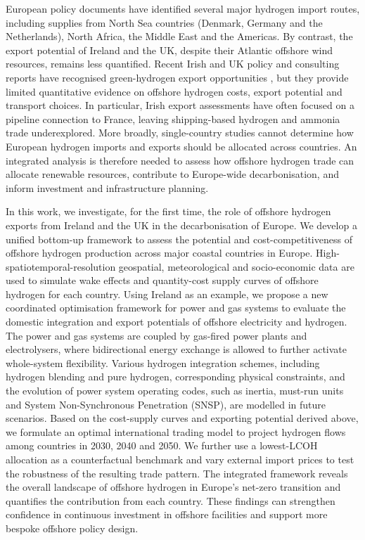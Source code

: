 \documentclass[pdflatex,sn-mathphys,Numbered]{sn-jnl}%
\begin{document}
European policy documents have identified several major hydrogen import routes,
including supplies from North Sea countries (Denmark, Germany and the Netherlands),
North Africa, the Middle East and the Americas. By contrast, the export potential
of Ireland and the UK, despite their Atlantic offshore wind resources, remains
less quantified. Recent Irish and UK policy and consulting reports have recognised
green-hydrogen export opportunities \cite{HydrogenImport, FutureFrameworkfor}, but
they provide limited quantitative evidence on offshore hydrogen costs, export
potential and transport choices. In particular, Irish export assessments have often
focused on a pipeline connection to France, leaving shipping-based hydrogen and
ammonia trade underexplored. More broadly, single-country studies cannot determine
how European hydrogen imports and exports should be allocated across countries.
An integrated analysis is therefore needed to assess how offshore hydrogen trade
can allocate renewable resources, contribute to Europe-wide decarbonisation, and
inform investment and infrastructure planning.

In this work, we investigate, for the first time, the role of offshore hydrogen exports from Ireland and the UK in the decarbonisation of Europe.
We develop a unified bottom-up framework to assess the potential and cost-competitiveness of offshore hydrogen production across major coastal countries in Europe. High-spatiotemporal-resolution geospatial, meteorological and socio-economic data are used to simulate wake effects and quantity-cost supply curves of offshore hydrogen for each country.
Using Ireland as an example, we propose a new coordinated optimisation framework for power and gas systems to evaluate the domestic integration and export potentials of offshore electricity and hydrogen. The power and gas systems are coupled by gas-fired power plants and electrolysers, where bidirectional energy exchange is allowed to further activate whole-system flexibility. Various hydrogen integration schemes, including hydrogen blending and pure hydrogen, corresponding physical constraints, and the evolution of power system operating codes, such as inertia, must-run units and System Non-Synchronous Penetration (SNSP), are modelled in future scenarios.
Based on the cost-supply curves and exporting potential derived above, we formulate an optimal international trading model to project hydrogen flows among countries in 2030, 2040 and 2050. We further use a lowest-LCOH allocation as a counterfactual benchmark and vary external import prices to test the robustness of the resulting trade pattern. The integrated framework reveals the overall landscape of offshore hydrogen in Europe's net-zero transition and quantifies the contribution from each country. These findings can strengthen confidence in continuous investment in offshore facilities and support more bespoke offshore policy design.
\end{document}
